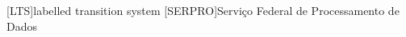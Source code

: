 \begin{acronym}[ACRÔNIMOS] 
[LTS]{labelled transition system}
[SERPRO]{Serviço Federal de Processamento de Dados}
\end{acronym}